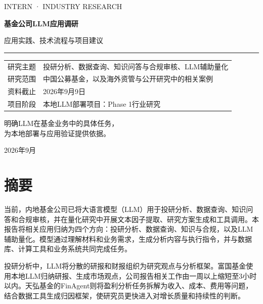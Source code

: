\documentclass[11pt,a4paper,fontset=none]{ctexart}
\begin{document}
\hypersetup{pageanchor=false}
\begin{titlepage}
\thispagestyle{empty}\setlength{\parindent}{0pt}
\vspace*{18mm}
{\sffamily\large\color{teal}INTERN · INDUSTRY RESEARCH\par}
\vspace{18mm}
{\Huge\bfseries\color{navy}基金公司LLM应用调研\par}
\vspace{8mm}
{\Large\color{muted}应用实践、技术流程与项目建议\par}
\vspace{15mm}\textcolor{teal}{\rule{\linewidth}{2pt}}\vspace{9mm}
\begin{tabularx}{\linewidth}{@{}P{28mm}Y@{}}
研究主题 & 投研分析、数据查询、知识问答与合规审核、LLM辅助量化\\
研究范围 & 中国公募基金，以及海外资管与公开研究中的相关案例\\
资料截止 & 2026年9月9日\\
项目阶段 & 本地LLM部署项目：Phase 1行业研究\\
\end{tabularx}
\vfill
{\large\color{navy}明确LLM在基金业务中的具体任务，\\[4pt]为本地部署与应用验证提供依据。\par}
\vspace{15mm}
{\small\color{muted}2026年9月\par}
\end{titlepage}
\hypersetup{pageanchor=true}

\section*{摘要}
当前，内地基金公司已将大语言模型（LLM）用于投研分析、数据查询、知识问答和合规审核，并在量化研究中开展文本因子提取、研究方案生成和工具调用。本报告将相关应用归纳为四个方向：投研分析、数据查询、知识与合规，以及LLM辅助量化。模型通过理解材料和业务需求，生成分析内容与执行指令，并与数据库、计算工具和业务系统共同完成任务。

投研分析中，LLM将分散的研报和财报组织为研究观点与分析框架。富国基金使用本地LLM归纳研报、生成市场观点，公司报告相关工作由一周以上缩短至3小时以内。天弘基金的FinAgent则将盈利分析任务拆解为收入、成本、费用等问题，结合数据工具生成归因框架，使研究员更快进入对增长质量和持续性的判断。
\end{document}
